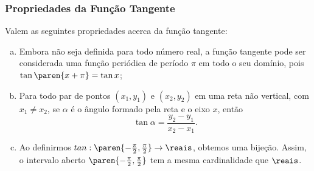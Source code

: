 \subsubsection{Propriedades da Função Tangente}

\begin{proposition}
    Valem as seguintes propriedades acerca da função tangente:

\begin{enumerate}[(a)]
  \item Embora não seja definida para todo número real, a função
  tangente pode ser considerada uma função periódica de período
  $\pi$ em todo o seu domínio, pois $\tan \paren{x+\pi} = \tan x$;
  \item Para todo par de pontos  $(x_1, y_1)$ e $(x_2, y_2)$ em uma reta não vertical, com $x_1 \neq x_2$, se
  $\alpha$ é o ângulo formado pela reta e o eixo $x$, então $$\tan
  \alpha = \frac {y_2 - y_1} {x_2 - x_1}.$$
  \item Ao definirmos $tan: \paren{- \frac {\pi} 2, \frac {\pi} 2} \to \reais$,
obtemos uma bijeção. Assim, o intervalo aberto $\paren{- \frac {\pi}
2, \frac {\pi} 2}$ tem a mesma cardinalidade que $\reais$.
\end{enumerate}
\end{proposition}

